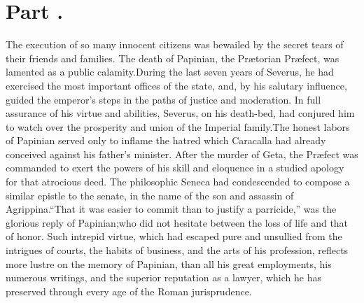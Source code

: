 \section{Part \thesection.}
\thispagestyle{simple}

The execution of so many innocent citizens was bewailed by the
secret tears of their friends and families. The death of
Papinian, the Prætorian Præfect, was lamented as a public
calamity.\footnotemark[282] During the last seven years of Severus, he had
exercised the most important offices of the state, and, by his
salutary influence, guided the emperor’s steps in the paths of
justice and moderation. In full assurance of his virtue and
abilities, Severus, on his death-bed, had conjured him to watch
over the prosperity and union of the Imperial family.\footnotemark[29] The
honest labors of Papinian served only to inflame the hatred which
Caracalla had already conceived against his father’s minister.
After the murder of Geta, the Præfect was commanded to exert the
powers of his skill and eloquence in a studied apology for that
atrocious deed. The philosophic Seneca had condescended to
compose a similar epistle to the senate, in the name of the son
and assassin of Agrippina.\footnotemark[30] “That it was easier to commit than
to justify a parricide,” was the glorious reply of Papinian;\footnotemark[31]
who did not hesitate between the loss of life and that of honor.
Such intrepid virtue, which had escaped pure and unsullied from
the intrigues of courts, the habits of business, and the arts of
his profession, reflects more lustre on the memory of Papinian,
than all his great employments, his numerous writings, and the
superior reputation as a lawyer, which he has preserved through
every age of the Roman jurisprudence.\footnotemark[32]







